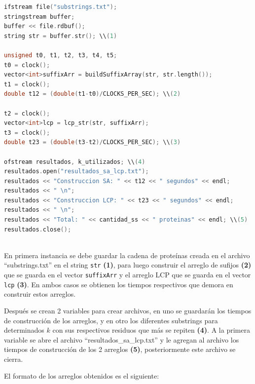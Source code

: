 \begin{lstlisting}[language=C++, caption=Obtención de los arreglos SA y LCP para la cadena de proteínas.]
ifstream file("substrings.txt");
stringstream buffer;
buffer << file.rdbuf();
string str = buffer.str(); \\(1)

unsigned t0, t1, t2, t3, t4, t5;
t0 = clock();
vector<int>suffixArr = buildSuffixArray(str, str.length());
t1 = clock();
double t12 = (double(t1-t0)/CLOCKS_PER_SEC); \\(2)

t2 = clock();
vector<int>lcp = lcp_str(str, suffixArr);
t3 = clock();
double t23 = (double(t3-t2)/CLOCKS_PER_SEC); \\(3)

ofstream resultados, k_utilizados; \\(4)
resultados.open("resultados_sa_lcp.txt");
resultados << "Construccion SA: " << t12 << " segundos" << endl;
resultados << " \n";
resultados << "Construccion LCP: " << t23 << " segundos" << endl;
resultados << " \n";
resultados << "Total: " << cantidad_ss << " proteinas" << endl; \\(5)
resultados.close();
	
\end{lstlisting}

En primera instancia se debe guardar la cadena de proteínas creada en el archivo ``substrings.txt'' en el string \texttt{str} \textbf{(1)}, para luego construir el arreglo de sufijos \textbf{(2)} que se guarda en el vector \texttt{suffixArr} y el arreglo LCP que se guarda en el vector \texttt{lcp} \textbf{(3)}. En ambos casos se obtienen los tiempos respectivos que demora en construir estos arreglos.

Después se crean 2 variables para crear archivos, en uno se guardarán los tiempos de construcción de los arreglos, y en otro los diferentes substrings para determinados $k$ con sus respectivos residuos que más se repiten \textbf{(4)}. A la primera variable se abre el archivo ``resultados\_sa\_lcp.txt'' y le agregan al archivo los tiempos de construcción de los 2 arreglos \textbf{(5)}, posteriormente este archivo se cierra.

El formato de los arreglos obtenidos es el siguiente:

